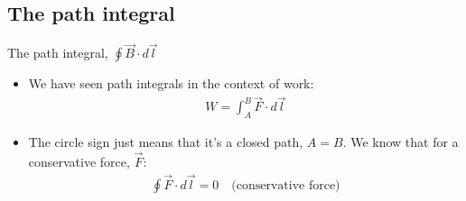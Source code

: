 \documentclass[aspectratio=169,
hyperref={colorlinks,urlcolor=blue}
]{beamer}
\begin{document}
\subsection{The path integral}
\label{subsec:thepathintegral}
\begin{frame}{The path integral, $\oint \vec B \cdot d\vec l$}
\begin{itemize}
\item We have seen path integrals in the context of work:
\begin{align*}
W = \int_A^B \vec F \cdot d\vec l
\end{align*}
\item The circle sign just means that it's a closed path, $A=B$. We know that for a conservative force, $\vec F$:
\begin{align*}
 \oint \vec F \cdot d\vec l = 0 \quad \text{(conservative force)}
\end{align*}
\end{itemize}
\end{frame}





\end{document}
